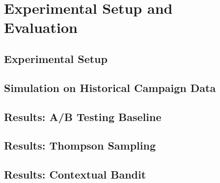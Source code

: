 \chapter{Experimental Setup and Evaluation}
\label{chap:evaluation}


\section{Experimental Setup}

\section{Simulation on Historical Campaign Data}

\section{Results: A/B Testing Baseline}

\section{Results: Thompson Sampling}

\section{Results: Contextual Bandit}

